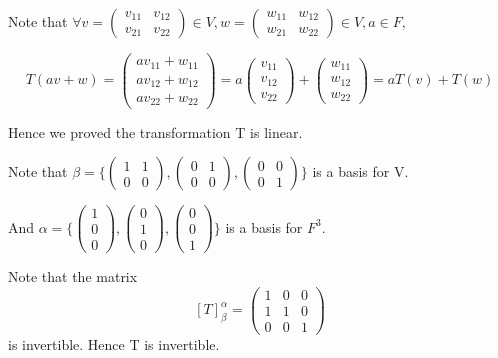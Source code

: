 \documentclass[12pt]{article}%
\begin{document}
Note that $\forall v=\begin{pmatrix}v_{11}&v_{12}\\v_{21}&v_{22}\end{pmatrix}\in V, w=\begin{pmatrix}w_{11}&w_{12}\\w_{21}&w_{22}\end{pmatrix}\in V, a \in F,$

$$T(av+w)=\begin{pmatrix}av_{11}+w_{11}\\av_{12}+w_{12}\\av_{22}+w_{22}\end{pmatrix}=a\begin{pmatrix}v_{11}\\v_{12}\\v_{22}\end{pmatrix}+\begin{pmatrix}w_{11}\\w_{12}\\w_{22}\end{pmatrix}=aT(v)+T(w)$$

Hence we proved the transformation T is linear. 

Note that $\beta=\{\begin{pmatrix}1&1\\0&0\end{pmatrix},\begin{pmatrix}0&1\\0&0\end{pmatrix},\begin{pmatrix}0&0\\0&1\end{pmatrix}\}$ is a basis for V. 

And $\alpha=\{\begin{pmatrix}1\\0\\0\end{pmatrix},\begin{pmatrix}0\\1\\0\end{pmatrix},\begin{pmatrix}0\\0\\1\end{pmatrix}\}$ is a basis for $F^3$.

Note that the matrix $$[T]_{\beta}^{\alpha}=\begin{pmatrix}1&0&0\\1&1&0\\0&0&1\end{pmatrix}$$ is invertible. Hence T is invertible. 
\end{document}
